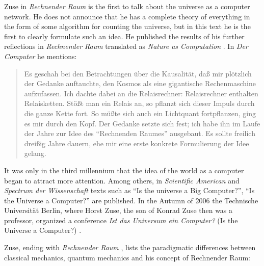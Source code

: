 \documentclass[pdftex,12pt]{article}
\begin{document}
 Zuse in \emph{Rechnender Raum} \parencite*{Zuse1967} is the first to talk about the universe as a computer network. He does not announce that he has a complete theory of everything in the form of some algorithm for counting the universe, but in this text he is the first to clearly formulate such an idea. He published the results of his further reflections in \emph{Rechnender Raum} \parencite*{Zuse1969} translated as \emph{Nature as Computation} \parencite* {Zuse2012}. In \emph {Der Computer} \parencite* {Zuse2010} he mentions: 
 \begin{quote} \small 
Es geschah bei den Betrachtungen {\"u}ber die Kausalit{\"a}t, da{\ss} mir pl{\"o}tzlich der Gedanke auftauchte, den Kosmos als eine gigantische Rechenmaschine aufzufassen. Ich dachte dabei an die Relaisrechner: Relaisrechner enthalten Relaisketten. St{\"o}{\ss}t man ein Relais an, so pflanzt sich dieser Impuls durch die ganze Kette fort. So m{\"u}{\ss}te sich auch ein Lichtquant fortpflanzen, ging es mir durch den Kopf. Der Gedanke setzte sich fest; ich habe ihn im Laufe der Jahre zur Idee des ``Rechnenden Raumes'' ausgebaut. Es sollte freilich drei{\ss}ig Jahre dauern, ehe mir eine erste konkrete Formulierung der Idee gelang.
 \end{quote} 
 It was only in the third millennium that the idea of the world as a computer began to attract more attention. Among others, in \emph{Scientific American} and \emph{Spectrum der Wissenschaft} texts such as ``Is the universe a Big Computer?'', ``Is the Universe a Computer?'' are published. In the Autumn of 2006 the Technische Universit{\"a}t Berlin, where Horst Zuse, the son of Konrad Zuse then was a professor, organized a conference \emph{Ist das Universum ein Computer?} (Is the Universe a Computer?) \parencite[p.61]{German2012}.

Zuse, ending with \emph{Rechnender Raum} \parencite*[p.344]{Zuse1967}, \parencite*[p.56]{Zuse2012a} lists the paradigmatic differences between classical mechanics, quantum mechanics and his concept of Rechnender Raum:
\end{document}
